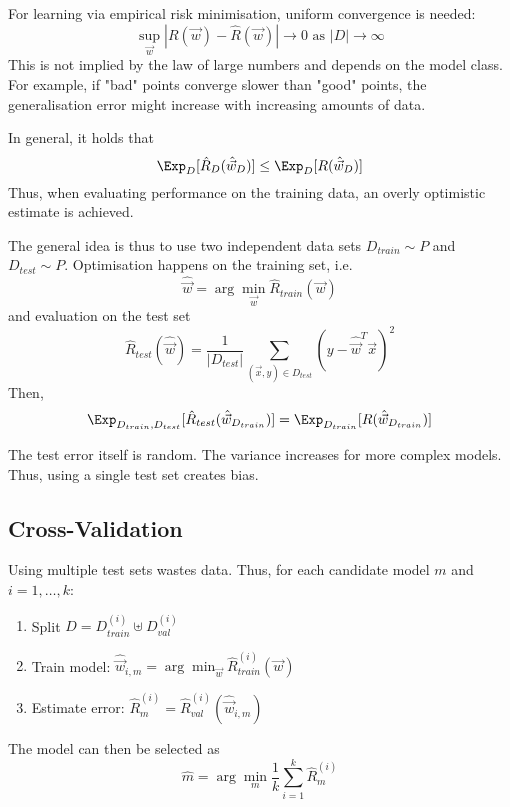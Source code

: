 For learning via empirical risk minimisation,
uniform convergence is needed:
\begin{equation*}
    \sup_{\vec{w}}{|R(\vec{w}) - \hat{R}(\vec{w})|} \to 0
    \text{ as $|D| \to \infty$}
\end{equation*}
This is not implied by the law of large numbers
and depends on the model class.
For example, if "bad" points converge slower than
"good" points, the generalisation error might increase
with increasing amounts of data.

In general, it holds that
\begin{equation*}
    \Exp_D[\hat{R}_D(\hat{\vec{w}}_D)] \leq
    \Exp_D[R(\hat{\vec{w}}_D)]
\end{equation*}
Thus, when evaluating performance on the training data,
an overly optimistic estimate is achieved.

The general idea is thus to use two independent data sets
$D_{train} \sim P$ and $D_{test} \sim P$.
Optimisation happens on the training set, i.e.
\begin{equation*}
    \hat{\vec{w}} = \arg\min_{\vec{w}}{\hat{R}_{train}(\vec{w})}
\end{equation*}
and evaluation on the test set
\begin{equation*}
    \hat{R}_{test}(\hat{\vec{w}}) = \frac{1}{|D_{test}|}
    \sum_{(\vec{x}, y) \in D_{test}}{
        (y - \hat{\vec{w}}^T \vec{x})^2
    }
\end{equation*}
Then,
\begin{equation*}
    \Exp_{D_{train}, D_{test}}[\hat{R}_{test}(\hat{\vec{w}}_{D_{train}})] =
    \Exp_{D_{train}}[R(\hat{\vec{w}}_{D_{train}})]
\end{equation*}

The test error itself is random.
The variance increases for more complex models.
Thus, using a single test set creates bias.


\subsection{Cross-Validation}
Using multiple test sets wastes data.
Thus, for each candidate model $m$
and $i = 1, \dotsc, k$:
\begin{enumerate}
    \item Split $D = D_{train}^{(i)} \uplus D_{val}^{(i)}$
    \item Train model:
    $\hat{\vec{w}}_{i,m} = \arg\min_{\vec{w}}{\hat{R}_{train}^{(i)}(\vec{w})}$
    \item Estimate error:
    $\hat{R}_{m}^{(i)} = \hat{R}_{val}^{(i)}(\hat{\vec{w}}_{i, m})$
\end{enumerate}
The model can then be selected as
\begin{equation*}
    \hat{m} = \arg\min_m{\frac{1}{k}
        \sum_{i=1}^k{\hat{R}_m^{(i)}}
    }
\end{equation*}


